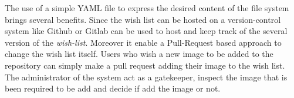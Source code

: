 The use of a simple YAML file to express the desired content of the file system
brings several benefits.  Since the wish list can be hosted on a
version-control system like Github or Gitlab can be used to host and keep track
of the several version of the \textit{wish-list}. Moreover it enable a
Pull-Request based approach to change the wish list itself. Users who wish a
new image to be added to the repository can simply make a pull request adding
their image to the wish list. The administrator of the system act as a
gatekeeper, inspect the image that is been required to be add and decide if add
the image or not.

